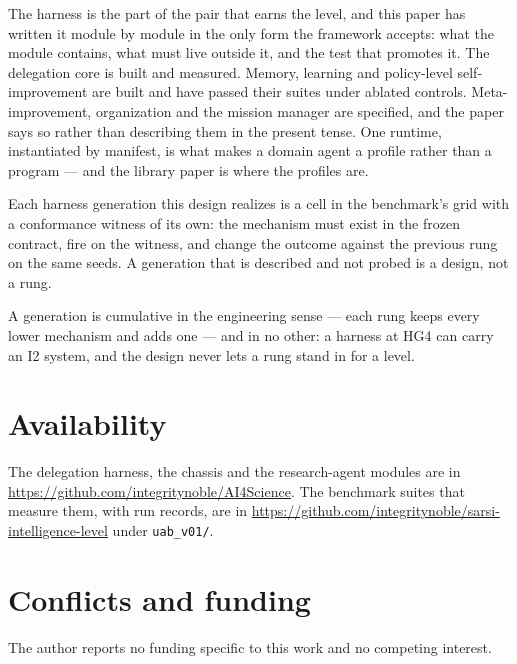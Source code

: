 \documentclass[11pt]{article}
\theoremstyle{definition}
\begin{document}
The harness is the part of the pair that earns the level, and this paper has written it module by module in the only form the framework accepts: what the module contains, what must live outside it, and the test that promotes it. The delegation core is built and measured. Memory, learning and policy-level self-improvement are built and have passed their suites under ablated controls. Meta-improvement, organization and the mission manager are specified, and the paper says so rather than describing them in the present tense. One runtime, instantiated by manifest, is what makes a domain agent a profile rather than a program --- and the library paper is where the profiles are.

Each harness generation this design realizes is a cell in the benchmark's grid with a conformance witness of its own: the mechanism must exist in the frozen contract, fire on the witness, and change the outcome against the previous rung on the same seeds. A generation that is described and not probed is a design, not a rung.

A generation is cumulative in the engineering sense --- each rung keeps every lower mechanism and adds one --- and in no other: a harness at HG4 can carry an I2 system, and the design never lets a rung stand in for a level.

\section*{Availability}

The delegation harness, the chassis and the research-agent modules are in \url{https://github.com/integritynoble/AI4Science}. The benchmark suites that measure them, with run records, are in \url{https://github.com/integritynoble/sarsi-intelligence-level} under \texttt{uab\_v01/}.

\section*{Conflicts and funding}

The author reports no funding specific to this work and no competing interest.



\end{document}
